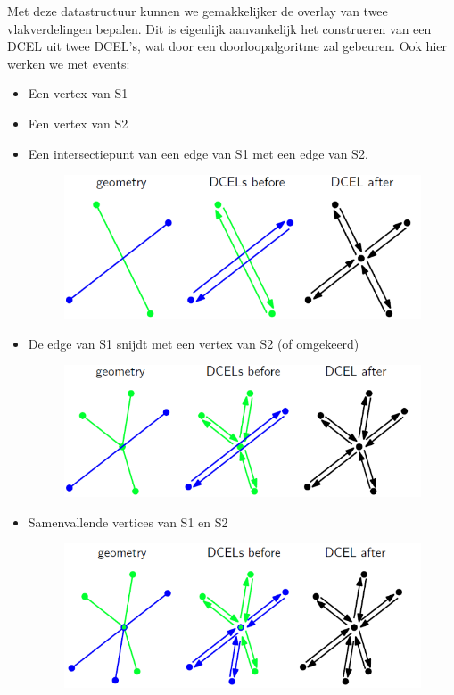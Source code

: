 \documentclass[12pt,a4paper]{article}
\begin{document}
	Met deze datastructuur kunnen we gemakkelijker de overlay van twee vlakverdelingen bepalen. Dit is eigenlijk aanvankelijk het construeren van een DCEL uit twee DCEL's, wat door een doorloopalgoritme zal gebeuren. Ook hier werken we met events: 
	\begin{itemize}
		\item Een vertex van S1
		\item Een vertex van S2
		\item Een intersectiepunt van een edge van S1 met een edge van S2. 
		\begin{figure}[H]
			\centering
			\includegraphics[width=0.7\linewidth]{afbeeldingen/intersection-DCEL}
			\label{fig:intersection-dcel}
		\end{figure}
		\item De edge van S1 snijdt met een vertex van S2 (of omgekeerd)
		\begin{figure}[H]
			\centering
			\includegraphics[width=0.7\linewidth]{afbeeldingen/DCEL-vertex&edge}
			\label{fig:dcel-vertexedge}
		\end{figure}
		\item Samenvallende vertices van S1 en S2
		\begin{figure}[H]
			\centering
			\includegraphics[width=0.7\linewidth]{afbeeldingen/DCEL-vertices}
			\label{fig:dcel-vertices}
		\end{figure}
	\end{itemize}
\end{document}
